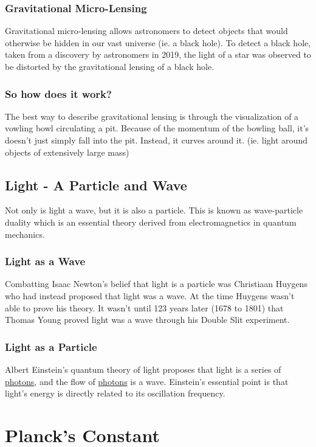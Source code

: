 \documentclass{article}
\begin{document}
\subsubsection{Gravitational Micro-Lensing}
Gravitational micro-lensing allows astronomers to detect objects that would otherwise be hidden in our vast universe (ie. a black hole). To detect a black hole, taken from a discovery by astronomers in 2019, the light of a star was observed to be distorted by the gravitational lensing of a black hole.

\subsubsection{So how does it work?}
The best way to describe gravitational lensing is through the visualization of a vowling bowl circulating a pit. Because of the momentum of the bowling ball, it's doesn't just simply fall into the pit. Instead, it curves around it. (ie. light around objects of extensively large mass)

\subsection{Light - A Particle and Wave}
Not only is light a wave, but it is also a particle. This is known as wave-particle duality which is an essential theory derived from electromagnetics in quantum mechanics.

\subsubsection{Light as a Wave}
Combatting Isaac Newton's belief that light is a particle was Christiaan Huygens who had instead proposed that light was a wave. At the time Huygens wasn't able to prove his theory. It wasn't until 123 years later (1678 to 1801) that Thomas Young proved light was a wave through his Double Slit experiment.

\subsubsection{Light as a Particle}
Albert Einstein's quantum theory of light proposes that light is a series of \hyperref[sec:photons]{photons}, and the flow of \hyperref[sec:photons]{photons} is a wave. Einstein's essential point is that light's energy is directly related to its oscillation frequency.



\section{Planck's Constant}
\end{document}

